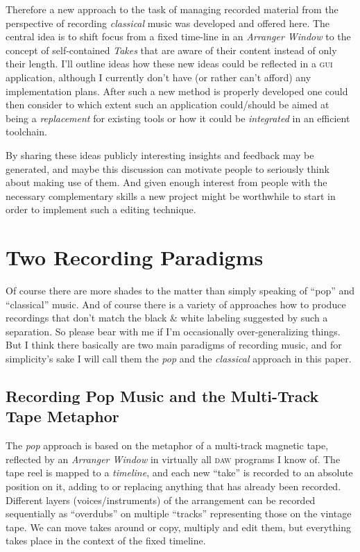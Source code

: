 \documentclass[11pt,a4paper]{article}
\begin{document}
Therefore a new approach to the task of managing
recorded material from the perspective of recording \emph{classical} music was developed and offered here.
The central idea is to shift focus from a fixed time-line in an \emph{Arranger
Window} to the concept of self-contained \emph{Takes} that are aware of their
content instead of only their length.
I'll outline ideas how these new ideas could be reflected in a \textsc{gui}
application, although I currently don't have (or rather can't afford) any
implementation plans.
After such a new method is properly developed one could then consider to which extent such an
application could/should be aimed at being a \emph{replacement} for existing
tools or how it could be \emph{integrated} in an efficient toolchain.

By sharing these ideas publicly interesting insights and
feedback may be generated, and maybe this discussion can motivate people to seriously think about
making use of them.
And given enough interest from people with the necessary complementary skills a new project might be worthwhile to start in order to implement such a editing technique.

\section{Two Recording Paradigms}

Of course there are more shades to the matter  than simply speaking of “pop” and
“classical” music.
And of course there is a variety of approaches how to produce recordings that
don't match the black \& white labeling suggested by such a separation.
So please bear with me if I'm occasionally over-generalizing things.
But I think there basically are two main paradigms of recording music, and for
simplicity's sake I will call them the \emph{pop} and the \emph{classical}
approach in this paper.

\subsection{Recording Pop Music and the Multi-Track Tape Metaphor}

The \emph{pop} approach is based on the metaphor of a multi-track magnetic tape,
reflected by an \emph{Arranger Window} in virtually all \textsc{daw} programs I
know of.
The tape reel is mapped to a \emph{timeline}, and each new “take” is recorded to
an absolute position on it, adding to or replacing anything that has already
been recorded.
Different layers (voices/instruments) of the arrangement can be recorded
sequentially as “overdubs” on multiple “tracks” representing those on the
vintage tape.
We can move takes around or copy, multiply and edit them, but everything takes
place in the context of the fixed timeline.
\end{document}
